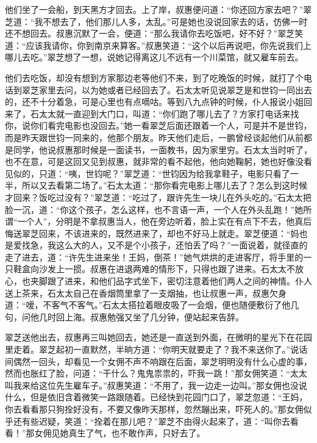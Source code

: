 \par 他们坐了一会船，到天黑方才回去。上了岸，叔惠便问道：“你还回方家去吧？”翠芝道：“我不想去了，他们那儿人多，太乱。”可是她也没说回家去的话，仿佛一时还不想回去。叔惠沉默了一会，便道：“那么我请你去吃饭吧，好不好？”翠芝笑道：“应该我请你，你到南京来算客。”叔惠笑道：“这个以后再说吧，你先说我们上哪儿去吃。”翠芝想了一想，说她记得离这儿不远有一个川菜馆，就又雇车前去。
\par 他们去吃饭，却没有想到方家那边老等他们不来，到了吃晚饭的时候，就打了个电话到翠芝家里去问，以为她或者已经回去了。石太太听见说翠芝是和世钧一同出去的，还不十分着急，可是心里也有点嘀咕。等到八九点钟的时候，仆人报说小姐回来了，石太太就一直迎到大门口，叫道：“你们跑了哪儿去了？方家打电话来找你，说你们看完电影也没回去。”她一看翠芝后面还跟着一个人，可是并不是世钧，而是昨天跟世钧一同来的，他那个朋友。昨天他们走后，一鹏曾经谈起他们从前都是同学，他说叔惠那时候是一面读书，一面教书，因为家里穷。石太太当时听了，也不在意，可是这回又见到叔惠，就非常的看不起他，他向她鞠躬，她也好像没看见似的，只道：“咦，世钧呢？”翠芝道：“世钧因为给我拿鞋子，电影只看了一半，所以又去看第二场了。”石太太道：“那你看完电影上哪儿去了？怎么到这时候才回来？饭吃过没有？”翠芝道：“吃过了，跟许先生一块儿在外头吃的。”石太太把脸一沉，道：“你这个孩子，怎么这样，也不言语一声，一个人在外头乱跑！”她所谓“一个人”，分明是不拿叔惠当人，他在旁边听着，脸上实在有点下不去，他真后悔送翠芝回来，不该进来的，既然进来了，却也不好马上就走。翠芝便道：“妈也是爱找急，我这么大的人，又不是个小孩子，还怕丢了吗？”一面说着，就径直的走了进去，道：“许先生进来坐！王妈，倒茶！”她气烘烘的走进客厅，将手里的一只鞋盒向沙发上一掼。叔惠在进退两难的情形下，只得也跟了进来。石太太不放心，也夹脚跟了进来，和他们品字式坐下，密切注意着他们两人之间的神情。仆人送上茶来，石太太自己在香烟筒里拿了一支烟抽，也让叔惠一声，叔惠欠身道：“嗳，不客气不客气。”石太太搭拉着眼皮吸了一会烟，便也随便敷衍了他几句，问他几时回上海。叔惠勉强又坐了几分钟，便站起来告辞。
\par 翠芝送他出去，叔惠再三叫她回去，她还是一直送到外面，在微明的星光下在花园里走着。翠芝起初一直默然，半晌方道：“你明天就要走了？我不来送你了。”说话间偶然一回头，却看见一个女佣不声不响跟在后面，翠芝明明没有什么心虚的事，然而也胀红了脸，问道：“干什么？鬼鬼祟祟的，吓我一跳！”那女佣笑道：“太太叫我来给这位先生雇车子。”叔惠笑道：“不用了，我一边走一边叫。”那女佣也没说什么，但是依旧含着微笑一路跟随着。已经快到花园门口了，翠芝忽道：“王妈，你去看看那只狗拴好没有，不要又像昨天那样，忽然蹦出来，吓死人的。”那女佣似乎还有些迟疑，笑道：“拴着在那儿吧？”翠芝不由得火起来了，道：“叫你去看看！”那女佣见她真生了气，也不敢作声，只好去了。
